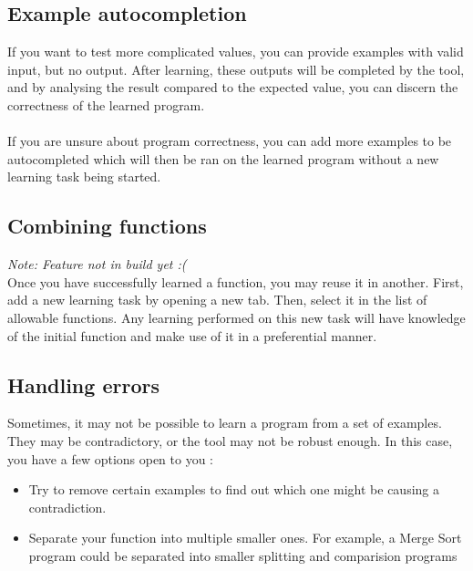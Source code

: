\documentclass[a4paper]{article}
\begin{document}
\subsection*{Example autocompletion}

If you want to test more complicated values, you can provide examples with valid input, but no output. After learning, these outputs will be completed by the tool, and by analysing the result compared to the expected value, you can discern the correctness of the learned program. \\ \\
If you are unsure about program correctness, you can add more examples to be autocompleted which will then be ran on the learned program without a new learning task being started.

\subsection*{Combining functions}

\textit{Note: Feature not in build yet :(} \\
Once you have successfully learned a function, you may reuse it in another. First, add a new learning task by opening a new tab. Then, select it in the list of allowable functions. Any learning performed on this new task will have knowledge of the initial function and make use of it in a preferential manner.

\subsection*{Handling errors}

Sometimes, it may not be possible to learn a program from a set of examples. They may be contradictory, or the tool may not be robust enough. In this case, you have a few options open to you :

\begin{itemize}
\item Try to remove certain examples to find out which one might be causing a contradiction.
\item Separate your function into multiple smaller ones. For example, a Merge Sort program could be separated into smaller splitting and comparision programs
\end{itemize}
\end{document}
